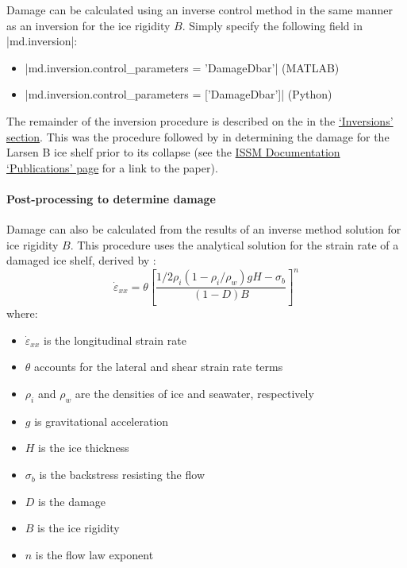Damage can be calculated using an inverse control method in the same manner as an inversion for the ice rigidity $B$. Simply specify the following field in \lstinlinebg|md.inversion|:
\begin{itemize}
	\item \lstinlinebg|md.inversion.control_parameters = {'DamageDbar'}| (MATLAB)
	\item \lstinlinebg|md.inversion.control_parameters = ['DamageDbar']| (Python)
\end{itemize}

The remainder of the inversion procedure is described on the 
in the \hyperref[sec:using-issm-capabilities-inversions]{`Inversions' section}.
This was the procedure followed by \cite{Borstad2012} in determining the damage for the Larsen B ice shelf prior to its collapse (see the 
\href{\publicationsUrl}{ISSM Documentation `Publications' page}
for a link to the paper).

\paragraph{Post-processing to determine damage}
Damage can also be calculated from the results of an inverse method solution for ice rigidity $B$. This procedure uses the analytical solution for the strain rate of a damaged ice shelf, derived by \cite{Borstad2013}:
\begin{equation}
	\dot{\varepsilon}_{xx}=\theta\left[\frac{1/2\rho_i\left(1-\rho_i/\rho_w\right)
	gH-\sigma_b}{\left(1-D\right)B}\right]^n
\end{equation}
where:
\begin{itemize}
	\item $\dot{\varepsilon}_{xx}$ is the longitudinal strain rate
	\item $\theta$ accounts for the lateral and shear strain rate terms
	\item $\rho_i$ and $\rho_w$ are the densities of ice and seawater, respectively
	\item $g$ is gravitational acceleration
	\item $H$ is the ice thickness
	\item $\sigma_b$ is the backstress resisting the flow
	\item $D$ is the damage
	\item $B$ is the ice rigidity
	\item $n$ is the flow law exponent
\end{itemize}

